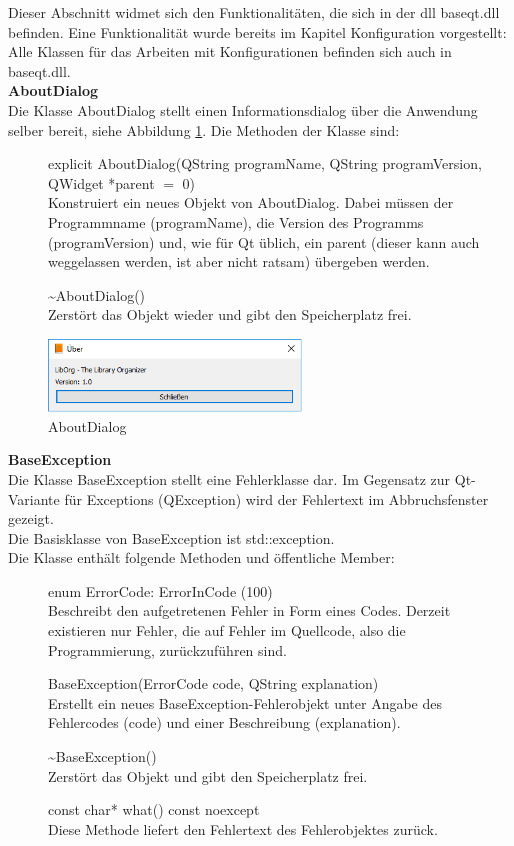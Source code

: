 Dieser Abschnitt widmet sich den Funktionalitäten, die sich in der dll baseqt.dll befinden. Eine Funktionalität wurde bereits im Kapitel Konfiguration vorgestellt: Alle Klassen für das Arbeiten mit Konfigurationen befinden sich auch in baseqt.dll.\bigskip \\
\textbf{AboutDialog}\\
Die Klasse AboutDialog stellt einen Informationsdialog über die Anwendung selber bereit, siehe Abbildung \ref{fig:AboutDialog}. Die Methoden der Klasse sind:
\begin{description}
	\item[ ] explicit AboutDialog(QString programName, QString programVersion, QWidget *parent $=$ 0)\\
	Konstruiert ein neues Objekt von AboutDialog. Dabei müssen der Programmname (programName), die Version des Programms (programVersion) und, wie für Qt üblich, ein parent (dieser kann auch weggelassen werden, ist aber nicht ratsam) übergeben werden.
   \item[ ] \~{}AboutDialog()\\
	Zerstört das Objekt wieder und gibt den Speicherplatz frei.
\end{description}
\begin{figure}[htb]
	\centering
		\includegraphics[width=0.60\textwidth]{figures/AboutDialog.png}
	\caption{AboutDialog}
	\label{fig:AboutDialog}
\end{figure}

\textbf{BaseException}\\
Die Klasse BaseException stellt eine Fehlerklasse dar. Im Gegensatz zur Qt-Variante für Exceptions (QException) wird der Fehlertext im Abbruchsfenster gezeigt.\\
Die Basisklasse von BaseException ist std::exception.\\
Die Klasse enthält folgende Methoden und öffentliche Member:
\begin{description}
	\item[ ] enum ErrorCode: ErrorInCode (100)\\
	Beschreibt den aufgetretenen Fehler in Form eines Codes. Derzeit existieren nur Fehler, die auf Fehler im Quellcode, also die Programmierung, zurückzuführen sind.
  \item[ ] BaseException(ErrorCode code, QString explanation)\\
	Erstellt ein neues BaseException-Fehlerobjekt unter Angabe des Fehlercodes (code) und einer Beschreibung (explanation).
  \item[ ] \~{}BaseException()\\
	Zerstört das Objekt und gibt den Speicherplatz frei.
  \item[ ] const char* what() const noexcept\\
	Diese Methode liefert den Fehlertext des Fehlerobjektes zurück. 
\end{description}

